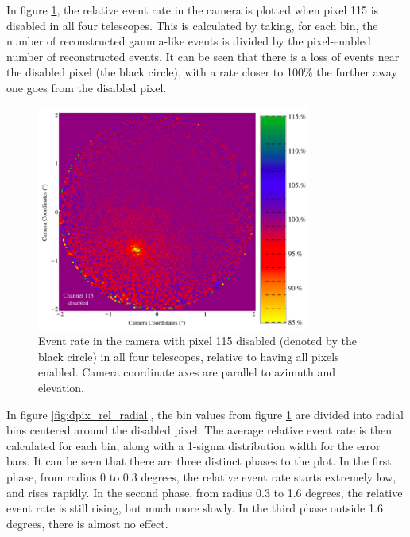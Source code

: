 In figure \ref{fig:dpix_rel_camera}, the relative event rate in the camera is plotted when pixel 115 is disabled in all four telescopes.
This is calculated by taking, for each bin, the number of reconstructed gamma-like events is divided by the pixel-enabled number of reconstructed events.
It can be seen that there is a loss of events near the disabled pixel (the black circle), with a rate closer to 100\% the further away one goes from the disabled pixel.

\begin{figure}[h]\label{fig:dpix_rel_camera}
  \begin{center}
    \includegraphics[width=0.8\textwidth]{images/disabled_pixel/relativerate_camera}
    \caption[Relative Event Rate]{Event rate in the camera with pixel 115 disabled (denoted by the black circle) in all four telescopes, relative to having all pixels enabled.  Camera coordinate axes are parallel to azimuth and elevation.}
  \end{center}
\end{figure}

In figure \ref{fig:dpix_rel_radial}, the bin values from figure \ref{fig:dpix_rel_camera} are divided into radial bins centered around the disabled pixel.
The average relative event rate is then calculated for each bin, along with a 1-sigma distribution width for the error bars.
It can be seen that there are three distinct phases to the plot.
In the first phase, from radius 0 to 0.3 degrees, the relative event rate starts extremely low, and rises rapidly.
In the second phase, from radius 0.3 to 1.6 degrees, the relative event rate is still rising, but much more slowly.
In the third phase outside 1.6 degrees, there is almost no effect.


